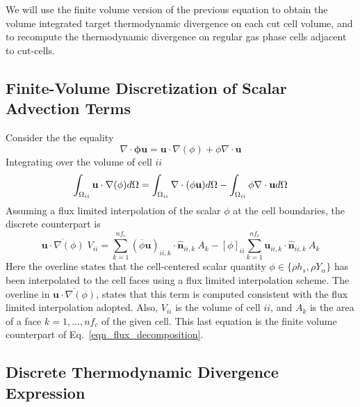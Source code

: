 We will use the finite volume version of the previous equation to obtain the volume integrated target thermodynamic divergence on each cut cell volume, and to recompute the thermodynamic divergence on regular gas phase cells adjacent to cut-cells.


\subsection{Finite-Volume Discretization of Scalar Advection Terms}

Consider the the equality
%
\begin{equation}
    \nabla \cdot \mathbf{\phi u} = \mathbf{u} \cdot \nabla (\phi) + \phi \nabla \cdot \mathbf{u} \label{eq:advforms}
\end{equation}
%
Integrating over the volume of cell $ii$
%
\begin{equation}
    \int_{\Omega_{ii}} {\mathbf{u} \cdot \nabla(\phi)} d\Omega =
    \int_{\Omega_{ii}} \nabla \cdot ({\phi} \mathbf{u}) d\Omega -
    \int_{\Omega_{ii}} \phi \nabla \cdot \mathbf{u} d\Omega \label{eq:flxlim1} \\
\end{equation}
Assuming a flux limited interpolation of the scalar $\phi$ at the cell boundaries, the discrete counterpart is
%
\begin{equation}
    \overline{\mathbf{u} \cdot \nabla(\phi)} \; V_{ii} =
    \sum_{k=1}^{nf_c} (\overline{\phi} \mathbf{u})_{ii,k} \cdot \hat{\mathbf{n}}_{ii,k} \: A_k -
    [\phi]_{ii} \sum_{k=1}^{nf_c} \mathbf{u}_{ii,k} \cdot \hat{\mathbf{n}}_{ii,k} \: A_k \label{eq:flxlim2}
\end{equation}
%
Here the overline states that the cell-centered scalar quantity $\phi \in \{\rho h_s, \rho Y_\alpha\}$ has been interpolated to the cell faces using a flux limited interpolation scheme. The overline in $\overline{\mathbf{u} \cdot \nabla(\phi)}$, states that this term is computed consistent with the flux limited interpolation adopted. Also, $V_{ii}$ is the volume of cell $ii$, and $A_k$ is the area of a face $k=1,...,nf_c$ of the given cell. This last equation is the finite volume counterpart of Eq.~\eqref{eqn_flux_decomposition}. %

\subsection{Discrete Thermodynamic Divergence Expression}

